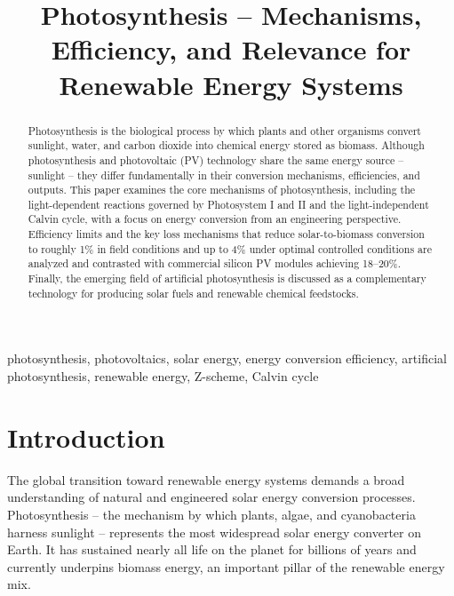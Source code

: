 \documentclass[conference]{IEEEtran}
\begin{document}
\title{Photosynthesis -- Mechanisms, Efficiency, and Relevance for Renewable Energy Systems}

\author{
}

\maketitle

\begin{abstract}
Photosynthesis is the biological process by which plants and other organisms convert sunlight, water, and carbon dioxide into chemical energy stored as biomass. Although photosynthesis and photovoltaic (PV) technology share the same energy source -- sunlight -- they differ fundamentally in their conversion mechanisms, efficiencies, and outputs. This paper examines the core mechanisms of photosynthesis, including the light-dependent reactions governed by Photosystem I and II and the light-independent Calvin cycle, with a focus on energy conversion from an engineering perspective. Efficiency limits and the key loss mechanisms that reduce solar-to-biomass conversion to roughly 1\% in field conditions and up to 4\% under optimal controlled conditions are analyzed and contrasted with commercial silicon PV modules achieving 18--20\%. Finally, the emerging field of artificial photosynthesis is discussed as a complementary technology for producing solar fuels and renewable chemical feedstocks.
\end{abstract}

\begin{IEEEkeywords}
photosynthesis, photovoltaics, solar energy, energy conversion efficiency, artificial photosynthesis, renewable energy, Z-scheme, Calvin cycle
\end{IEEEkeywords}

\section{Introduction}

The global transition toward renewable energy systems demands a broad understanding of natural and engineered solar energy conversion processes. Photosynthesis -- the mechanism by which plants, algae, and cyanobacteria harness sunlight -- represents the most widespread solar energy converter on Earth. It has sustained nearly all life on the planet for billions of years and currently underpins biomass energy, an important pillar of the renewable energy mix.
\end{document}
